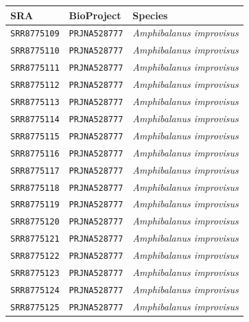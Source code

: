 \begin{table}[ht]
    \centering
    \begin{tabular}{lll}
        \toprule
            SRA & BioProject & Species \\
        \midrule
            \texttt{SRR8775109}  & \texttt{PRJNA528777} & \textit{Amphibalanus improvisus} \\
            \texttt{SRR8775110}  & \texttt{PRJNA528777} & \textit{Amphibalanus improvisus} \\
            \texttt{SRR8775111}  & \texttt{PRJNA528777} & \textit{Amphibalanus improvisus} \\
            \texttt{SRR8775112}  & \texttt{PRJNA528777} & \textit{Amphibalanus improvisus} \\
            \texttt{SRR8775113}  & \texttt{PRJNA528777} & \textit{Amphibalanus improvisus} \\
            \texttt{SRR8775114}  & \texttt{PRJNA528777} & \textit{Amphibalanus improvisus} \\
            \texttt{SRR8775115}  & \texttt{PRJNA528777} & \textit{Amphibalanus improvisus} \\
            \texttt{SRR8775116}  & \texttt{PRJNA528777} & \textit{Amphibalanus improvisus} \\
            \texttt{SRR8775117}  & \texttt{PRJNA528777} & \textit{Amphibalanus improvisus} \\
            \texttt{SRR8775118}  & \texttt{PRJNA528777} & \textit{Amphibalanus improvisus} \\
            \texttt{SRR8775119}  & \texttt{PRJNA528777} & \textit{Amphibalanus improvisus} \\
            \texttt{SRR8775120}  & \texttt{PRJNA528777} & \textit{Amphibalanus improvisus} \\
            \texttt{SRR8775121}  & \texttt{PRJNA528777} & \textit{Amphibalanus improvisus} \\
            \texttt{SRR8775122}  & \texttt{PRJNA528777} & \textit{Amphibalanus improvisus} \\
            \texttt{SRR8775123}  & \texttt{PRJNA528777} & \textit{Amphibalanus improvisus} \\
            \texttt{SRR8775124}  & \texttt{PRJNA528777} & \textit{Amphibalanus improvisus} \\
            \texttt{SRR8775125}  & \texttt{PRJNA528777} & \textit{Amphibalanus improvisus} \\

\end{tabular}
\end{table}
